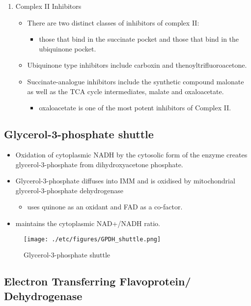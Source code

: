 \documentclass{scrartcl}
\begin{document}
\begin{enumerate}
\item Complex II Inhibitors
\label{sec:org3710da1}
\begin{itemize}
\item There are two distinct classes of inhibitors of complex II:
\begin{itemize}
\item those that bind in the succinate pocket and those that bind in the ubiquinone pocket.
\end{itemize}
\item Ubiquinone type inhibitors include carboxin and thenoyltrifluoroacetone.
\item Succinate-analogue inhibitors include the synthetic compound malonate as well as the TCA cycle intermediates, malate and oxaloacetate.
\begin{itemize}
\item oxaloacetate is one of the most potent inhibitors of Complex II.
\end{itemize}
\end{itemize}
\end{enumerate}
\subsection{Glycerol-3-phosphate shuttle}
\label{sec:orgc3b796b}
\begin{itemize}
\item Oxidation of cytoplasmic NADH by the cytosolic form of the enzyme
creates glycerol-3-phosphate from dihydroxyacetone phosphate.
\item Glycerol-3-phosphate diffuses into IMM and is oxidised by mitochondrial glycerol-3-phosphate dehydrogenase
\begin{itemize}
\item uses quinone as an oxidant and FAD as a co-factor.
\end{itemize}
\item maintains the cytoplasmic NAD+/NADH ratio.
\end{itemize}

\begin{figure}[htbp]
\centering
\texttt{[image: ./etc/figures/GPDH\_shuttle.png]}
\caption[g3ps]{\label{fig:org2517d24}
Glycerol-3-phosphate shuttle}
\end{figure}

\subsection{Electron Transferring Flavoprotein/ Dehydrogenase}
\label{sec:org99cf021}
\end{document}
